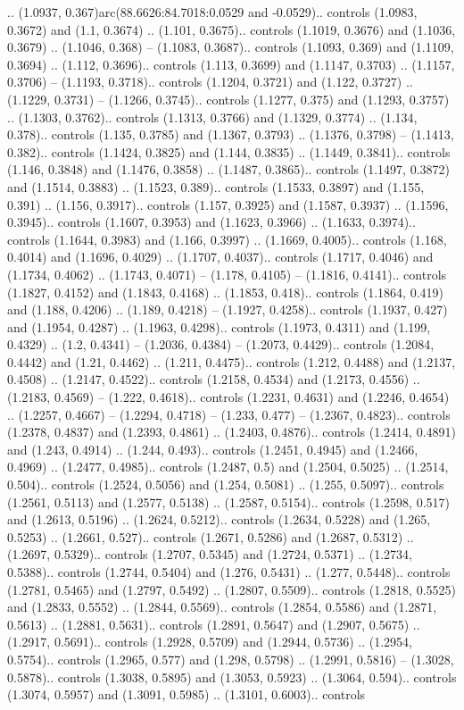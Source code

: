 .. (1.0937, 0.367)arc(88.6626:84.7018:0.0529 and -0.0529).. controls (1.0983, 0.3672) and (1.1, 0.3674) .. (1.101, 0.3675).. controls (1.1019, 0.3676) and (1.1036, 0.3679) .. (1.1046, 0.368) -- (1.1083, 0.3687).. controls (1.1093, 0.369) and (1.1109, 0.3694) .. (1.112, 0.3696).. controls (1.113, 0.3699) and (1.1147, 0.3703) .. (1.1157, 0.3706) -- (1.1193, 0.3718).. controls (1.1204, 0.3721) and (1.122, 0.3727) .. (1.1229, 0.3731) -- (1.1266, 0.3745).. controls (1.1277, 0.375) and (1.1293, 0.3757) .. (1.1303, 0.3762).. controls (1.1313, 0.3766) and (1.1329, 0.3774) .. (1.134, 0.378).. controls (1.135, 0.3785) and (1.1367, 0.3793) .. (1.1376, 0.3798) -- (1.1413, 0.382).. controls (1.1424, 0.3825) and (1.144, 0.3835) .. (1.1449, 0.3841).. controls (1.146, 0.3848) and (1.1476, 0.3858) .. (1.1487, 0.3865).. controls (1.1497, 0.3872) and (1.1514, 0.3883) .. (1.1523, 0.389).. controls (1.1533, 0.3897) and (1.155, 0.391) .. (1.156, 0.3917).. controls (1.157, 0.3925) and (1.1587, 0.3937) .. (1.1596, 0.3945).. controls (1.1607, 0.3953) and (1.1623, 0.3966) .. (1.1633, 0.3974).. controls (1.1644, 0.3983) and (1.166, 0.3997) .. (1.1669, 0.4005).. controls (1.168, 0.4014) and (1.1696, 0.4029) .. (1.1707, 0.4037).. controls (1.1717, 0.4046) and (1.1734, 0.4062) .. (1.1743, 0.4071) -- (1.178, 0.4105) -- (1.1816, 0.4141).. controls (1.1827, 0.4152) and (1.1843, 0.4168) .. (1.1853, 0.418).. controls (1.1864, 0.419) and (1.188, 0.4206) .. (1.189, 0.4218) -- (1.1927, 0.4258).. controls (1.1937, 0.427) and (1.1954, 0.4287) .. (1.1963, 0.4298).. controls (1.1973, 0.4311) and (1.199, 0.4329) .. (1.2, 0.4341) -- (1.2036, 0.4384) -- (1.2073, 0.4429).. controls (1.2084, 0.4442) and (1.21, 0.4462) .. (1.211, 0.4475).. controls (1.212, 0.4488) and (1.2137, 0.4508) .. (1.2147, 0.4522).. controls (1.2158, 0.4534) and (1.2173, 0.4556) .. (1.2183, 0.4569) -- (1.222, 0.4618).. controls (1.2231, 0.4631) and (1.2246, 0.4654) .. (1.2257, 0.4667) -- (1.2294, 0.4718) -- (1.233, 0.477) -- (1.2367, 0.4823).. controls (1.2378, 0.4837) and (1.2393, 0.4861) .. (1.2403, 0.4876).. controls (1.2414, 0.4891) and (1.243, 0.4914) .. (1.244, 0.493).. controls (1.2451, 0.4945) and (1.2466, 0.4969) .. (1.2477, 0.4985).. controls (1.2487, 0.5) and (1.2504, 0.5025) .. (1.2514, 0.504).. controls (1.2524, 0.5056) and (1.254, 0.5081) .. (1.255, 0.5097).. controls (1.2561, 0.5113) and (1.2577, 0.5138) .. (1.2587, 0.5154).. controls (1.2598, 0.517) and (1.2613, 0.5196) .. (1.2624, 0.5212).. controls (1.2634, 0.5228) and (1.265, 0.5253) .. (1.2661, 0.527).. controls (1.2671, 0.5286) and (1.2687, 0.5312) .. (1.2697, 0.5329).. controls (1.2707, 0.5345) and (1.2724, 0.5371) .. (1.2734, 0.5388).. controls (1.2744, 0.5404) and (1.276, 0.5431) .. (1.277, 0.5448).. controls (1.2781, 0.5465) and (1.2797, 0.5492) .. (1.2807, 0.5509).. controls (1.2818, 0.5525) and (1.2833, 0.5552) .. (1.2844, 0.5569).. controls (1.2854, 0.5586) and (1.2871, 0.5613) .. (1.2881, 0.5631).. controls (1.2891, 0.5647) and (1.2907, 0.5675) .. (1.2917, 0.5691).. controls (1.2928, 0.5709) and (1.2944, 0.5736) .. (1.2954, 0.5754).. controls (1.2965, 0.577) and (1.298, 0.5798) .. (1.2991, 0.5816) -- (1.3028, 0.5878).. controls (1.3038, 0.5895) and (1.3053, 0.5923) .. (1.3064, 0.594).. controls (1.3074, 0.5957) and (1.3091, 0.5985) .. (1.3101, 0.6003).. controls 